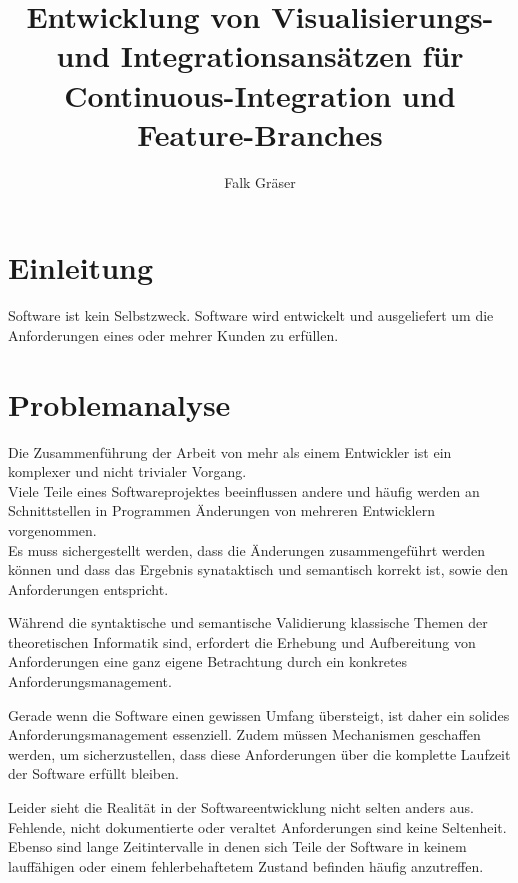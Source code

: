 \documentclass[12pt,a4paper]{book}
\author{Falk Gräser}
\title{Entwicklung von Visualisierungs- und Integrationsansätzen für Continuous-Integration und Feature-Branches}
\begin{document}
\maketitle

\tableofcontents

\chapter{Einleitung}

Software ist kein Selbstzweck. Software wird entwickelt und ausgeliefert um die Anforderungen eines oder mehrer Kunden zu erfüllen.

\chapter{Problemanalyse}



Die Zusammenführung der Arbeit von mehr als einem Entwickler ist ein komplexer und nicht trivialer Vorgang. \\
Viele Teile eines Softwareprojektes beeinflussen andere und häufig werden an Schnittstellen in Programmen Änderungen von mehreren Entwicklern vorgenommen. \\
Es muss sichergestellt werden, dass die Änderungen zusammengeführt werden können und dass das Ergebnis synataktisch und semantisch korrekt ist, sowie den Anforderungen entspricht.

Während die syntaktische und semantische Validierung klassische Themen der theoretischen Informatik sind, erfordert die Erhebung und Aufbereitung von Anforderungen eine ganz eigene Betrachtung durch ein konkretes Anforderungsmanagement.

Gerade wenn die Software einen gewissen Umfang übersteigt, ist daher ein solides Anforderungsmanagement essenziell. Zudem müssen Mechanismen geschaffen werden, um sicherzustellen, dass diese Anforderungen über die komplette Laufzeit der Software erfüllt bleiben. 

Leider sieht die Realität in der Softwareentwicklung nicht selten anders aus. Fehlende, nicht dokumentierte oder veraltet Anforderungen sind keine Seltenheit.\\
Ebenso sind lange Zeitintervalle in denen sich Teile der Software in keinem lauffähigen oder einem fehlerbehaftetem Zustand befinden häufig anzutreffen.
\end{document}
